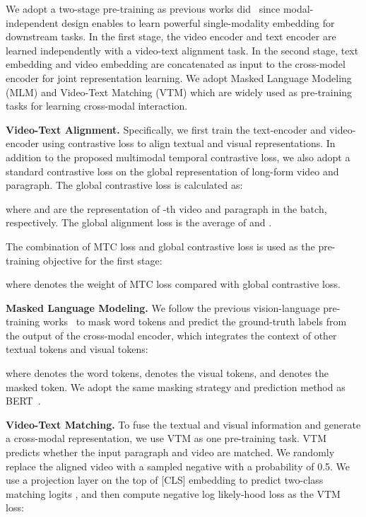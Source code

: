 \documentclass{article}
\begin{document}
We adopt a two-stage pre-training as previous works did~\cite{xue2021hdvila} since modal-independent design enables to learn powerful single-modality embedding for downstream tasks. In the first stage, the video encoder and text encoder are learned independently with a video-text alignment task. In the second stage, text embedding and video embedding are concatenated as input to the cross-model encoder for joint representation learning. We adopt Masked Language Modeling (MLM) and Video-Text Matching (VTM) which are widely used as pre-training tasks for learning cross-modal interaction.

\textbf{Video-Text Alignment.}
Specifically, we first train the text-encoder and video-encoder using contrastive loss to align textual and visual representations. In addition to the proposed multimodal temporal contrastive loss, we also adopt a standard contrastive loss on the global representation of long-form video and paragraph. The global contrastive loss is calculated as:

where  and  are the representation of -th video and paragraph in the batch, respectively. The global alignment loss  is the average of  and . 



The combination of MTC loss and global contrastive loss is used as the pre-training objective for the first stage:

where  denotes the weight of MTC loss compared with global contrastive loss.


\textbf{Masked Language Modeling.} 
We follow the previous vision-language pre-training works~\cite{huang2020pixelbert,li2021albef,xue2021probing} to mask word tokens and predict the ground-truth labels from the output of the cross-modal encoder, which integrates the context of other textual tokens and visual tokens:

where  denotes the word tokens,  denotes the visual tokens, and  denotes the masked token. We adopt the same masking strategy and prediction method as BERT~\cite{Devlin2018bert}.

\textbf{Video-Text Matching.}
To fuse the textual and visual information and generate a cross-modal representation, we use VTM as one pre-training task. VTM predicts whether the input paragraph and video are matched. We randomly replace the aligned video with a sampled negative with a probability of 0.5. We use a projection layer on the top of [CLS] embedding to predict two-class matching logits , and then compute negative log likely-hood loss as the VTM loss:
\end{document}

